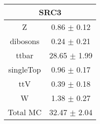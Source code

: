 \begin{tabular}{c|c}
\hline\hline
\multicolumn{2}{c}{\bf SRC3 } \\ \hline 
Z & 0.86 $\pm$ 0.12 \\
dibosons & 0.24 $\pm$ 0.21 \\
ttbar & 28.65 $\pm$ 1.99 \\
singleTop & 0.96 $\pm$ 0.17 \\
ttV & 0.39 $\pm$ 0.18 \\
W & 1.38 $\pm$ 0.27 \\
\hline
Total MC & 32.47 $\pm$ 2.04 \\
\hline\hline
\end{tabular}
